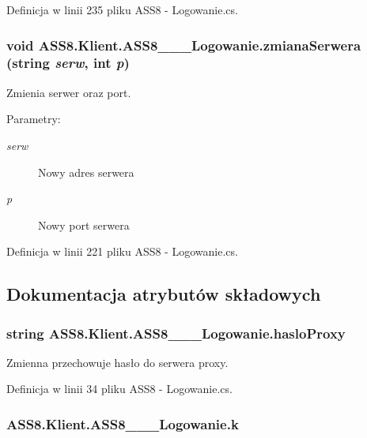 Definicja w linii 235 pliku ASS8 - Logowanie.cs.\hypertarget{a00001_677511611d58aa6b3b6e020334effe5b}{
\subsubsection[{zmianaSerwera}]{\setlength{\rightskip}{0pt plus 5cm}void ASS8.Klient.ASS8\_\-\_\-\_\-Logowanie.zmianaSerwera (string {\em serw}, \/  int {\em p})}}
\label{d8/d84/a00001_677511611d58aa6b3b6e020334effe5b}


Zmienia serwer oraz port. 

\begin{Desc}
\item[Parametry:]
\begin{description}
\item[{\em serw}]Nowy adres serwera\item[{\em p}]Nowy port serwera\end{description}
\end{Desc}


Definicja w linii 221 pliku ASS8 - Logowanie.cs.

\subsection{Dokumentacja atrybutów składowych}
\hypertarget{a00001_6fe76a3ea40d35657350ad7bf4a376fb}{
\subsubsection[{hasloProxy}]{\setlength{\rightskip}{0pt plus 5cm}string {\bf ASS8.Klient.ASS8\_\-\_\-\_\-Logowanie.hasloProxy}}}
\label{d8/d84/a00001_6fe76a3ea40d35657350ad7bf4a376fb}


Zmienna przechowuje hasło do serwera proxy. 



Definicja w linii 34 pliku ASS8 - Logowanie.cs.\hypertarget{a00001_61c4b44659455229b617f97173f005fa}{
\subsubsection[{k}]{ {\bf ASS8.Klient.ASS8\_\-\_\-\_\-Logowanie.k}}}
\label{d8/d84/a00001_61c4b44659455229b617f97173f005fa}




